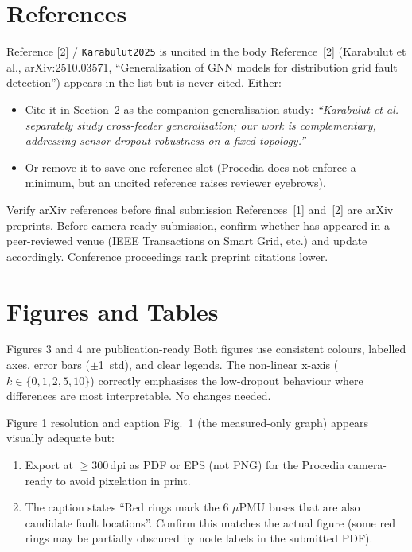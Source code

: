 \documentclass[11pt,a4paper]{article}
\begin{document}
\section{References}

\begin{warnbox}{Reference [2] / \texttt{Karabulut2025} is uncited in the body}
Reference~[2] (Karabulut et al., arXiv:2510.03571, ``Generalization of GNN
models for distribution grid fault detection'') appears in the list but is never
cited. Either:
\begin{itemize}[leftmargin=*]
  \item Cite it in Section~2 as the companion generalisation study:
    \textit{``Karabulut et al.~\cite{Karabulut2025} separately study
    cross-feeder generalisation; our work is complementary, addressing
    sensor-dropout robustness on a fixed topology.''}
  \item Or remove it to save one reference slot (Procedia does not enforce a
    minimum, but an uncited reference raises reviewer eyebrows).
\end{itemize}
\end{warnbox}

\begin{suggestbox}{Verify arXiv references before final submission}
References~[1] and~[2] are arXiv preprints. Before camera-ready submission,
confirm whether \cite{Karabulut2026} has appeared in a peer-reviewed venue
(IEEE Transactions on Smart Grid, etc.) and update accordingly. Conference
proceedings rank preprint citations lower.
\end{suggestbox}

\section{Figures and Tables}

\begin{okbox}{Figures 3 and 4 are publication-ready}
Both figures use consistent colours, labelled axes, error bars ($\pm$1~std),
and clear legends. The non-linear x-axis ($k \in \{0,1,2,5,10\}$) correctly
emphasises the low-dropout behaviour where differences are most interpretable.
No changes needed.
\end{okbox}

\begin{warnbox}{Figure 1 resolution and caption}
Fig.~1 (the measured-only graph) appears visually adequate but:
\begin{enumerate}[leftmargin=*,label=\arabic*.]
  \item Export at $\geq$300\,dpi as PDF or EPS (not PNG) for the Procedia
    camera-ready to avoid pixelation in print.
  \item The caption states ``Red rings mark the 6 $\mu$PMU buses that are
    also candidate fault locations''. Confirm this matches the actual figure
    (some red rings may be partially obscured by node labels in the
    submitted PDF).
\end{enumerate}
\end{warnbox}
\end{document}

